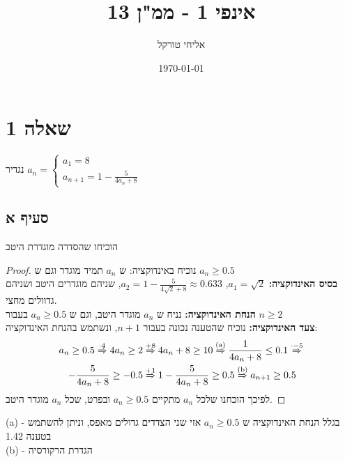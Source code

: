 \documentclass{article}
\title{אינפי 1 - ממ"ן 13}
\author{אליחי טורקל \ID}
\date\today
\begin{document}
	\maketitle %

	\section*{שאלה 1}
	נגדיר $a_n = \begin{cases}
		a_1 = 8 \\
		a_{n+1} = 1 - \frac{5}{4a_n + 8}
	\end{cases}$
	\subsection*{סעיף א}
	הוכיחו שהסדרה מוגדרת היטב

	\begin{proof}
		נוכיח באינדוקציה: ש $a_n$ תמיד מוגדר וגם ש $a_n \geq 0.5$ \\
		\textbf{בסיס האינדוקציה:} $a_1 = \sqrt{2}$, $a_2 = 1 - \frac{5}{4\sqrt{2} + 8} \approx 0.633$, שניהם מוגדרים היטב ושניהם גדוולים מחצי. \\
		\textbf{הנחת האינדוקציה:} נניח ש $a_n$ מוגדר היטב, וגם ש $a_n \geq 0.5$ בעבור $n \geq 2$ \\
		\textbf{צעד האינדוקציה:} נוכיח שהטענה נכונה בעבור $n+1$, ונשתמש בהנחת האינדוקציה:
		\begin{align*}
			a_n \geq 0.5 \overset{\cdot 4}\Rightarrow
			4a_n \geq 2 &\overset{+8}\Rightarrow
			4a_n + 8 \geq 10 \overset{\text{(a)}}\Rightarrow
			\frac{1}{4a_n+8} \leq 0.1 \overset{\cdot -5}\Rightarrow \\
			-\frac{5}{4a_n+8} \geq -0.5 &\overset{+1}\Rightarrow
			1-\frac{5}{4a_n+8} \geq 0.5 \overset{\text{(b)}}\Rightarrow
			a_{n+1} \geq 0.5
		\end{align*}
		לפיכך הוכחנו שלכל $a_n$ מתקיים $a_n \geq 0.5$ ובפרט, שכל $a_n$ מוגדר היטב.
	\end{proof} \nl
	(a) - בגלל הנחת האינדוקציה ש $a_n \geq 0.5$ אזי שני הצדדים גדולים מאפס, וניתן להשתמש בטענה 1.42 \\
	(b) - הגדרת הרקורסיה
	\pagebreak
\end{document}
